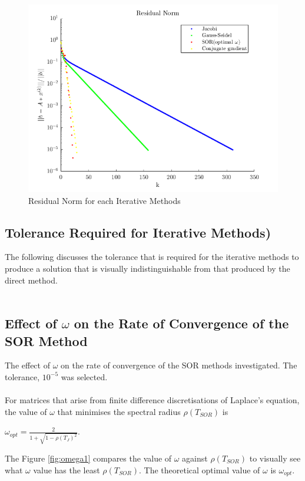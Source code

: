 \documentclass[12pt,a4paper]{article}
\begin{document}
\begin{figure}[H]
	\includegraphics[width=\linewidth]{images/ResidualNormGraph.png}
	\caption{Residual Norm for each Iterative Methods}
	\label{fig:res}
\end{figure}

\subsection{Tolerance Required for Iterative Methods)}
The following discusses the tolerance that is required for the iterative methods to produce a solution that is visually indistinguishable from that produced by the direct method.
\\\\
\subsection{Effect of $\omega$ on the Rate of Convergence of the SOR Method}
The effect of $\omega$ on the rate of convergence of the SOR methods investigated. The tolerance, $10^{-5}$ was selected.
\\\\
For matrices that arise from finite difference discretisations of Laplace's equation, the value of $\omega$ that minimises the spectral radius $\rho(T_{SOR})$ is 
\begin{center}
$\omega_{opt} = \frac{2}{1+\sqrt{1-\rho(T_{J})^{2}}}$.
\end{center}
The Figure \ref{fig:omega1} compares the value of $\omega$ against $\rho(T_{SOR})$ to visually see what $\omega$ value has the least $\rho(T_{SOR})$. The theoretical optimal value of $\omega$ is $\omega_{opt}$.
\end{document}
